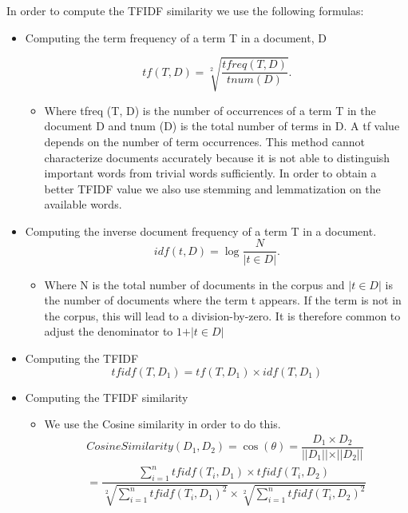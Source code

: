 In order to compute the TFIDF similarity we use the following formulas:
\begin{itemize}
	\item Computing the term frequency of a term T in a document, D 	

	\begin{equation}
	tf(T, D) = \sqrt[2]{\dfrac{tfreq(T, D)}{tnum(D)}}.
	\end{equation}

	\begin{itemize}
		\item Where tfreq (T, D) is the number of occurrences of a term T in the document D and tnum (D) is the total number of terms in D. A tf value depends on the number of term occurrences. This method cannot characterize documents accurately because it is not able to distinguish important words from trivial words sufficiently. In order to obtain a better TFIDF value we also use stemming and lemmatization on the available words. 
	\end{itemize}
	\item Computing the inverse document frequency of a term T in a document.
	\begin{equation}
	idf(t, D) = \log{\dfrac{N}{\vert t \in D \vert}}.
	\end{equation}
	\begin{itemize}
		\item Where N is the total number of documents in the corpus and $\vert{t \in D }\vert$ is the number of documents where the term t appears. If the term is not in the corpus, this will lead to a division-by-zero. It is therefore common to adjust the denominator to $1 + \vert{t \in D}\vert$
	\end{itemize}
	\item Computing the TFIDF
	\begin{equation}
		tfidf (T, D_{1}) = tf (T, D_{1}) \times idf(T,D_{1})
	\end{equation}
	\item Computing the TFIDF similarity
	\begin{itemize}
		\item We use the Cosine similarity in order to do this.
		\begin{equation}
			\begin{split}
				Cosine Similarity(D_{1},D_{2}) = \cos (\theta) = \dfrac{D_{1} \times D_{2}}{\vert\vert D_{1} \vert\vert \times  \vert\vert D_{2} \vert\vert}\\
				= \dfrac {\sum_{i=1}^{n} tfidf(T_{i}, D_{1}) \times tfidf(T_{i}, D_{2})} {\sqrt[2]{\sum_{i=1}^{n} tfidf(T_{i},D_{1} )^{2}} \times \sqrt[2]{\sum_{i=1}^{n} tfidf(T_{i},D_{2} )^{2}}} 

\end{split}
\end{equation}
\end{itemize}
\end{itemize}
